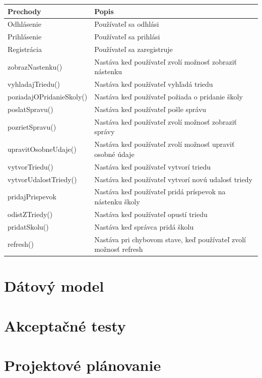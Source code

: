 \documentclass[slovak, 12pt, Times New Roman]{article}
\begin{document}
			\vspace{2cm}

			\begin{tabular} {|p{4.5cm}|p{10.5cm}|}
				\hline
				\textbf{Prechody} & \textbf{Popis} \\
				\hline
				Odhlásenie & Používateľ sa odhlási\\
				\hline
				Prihlásenie & Používateľ sa prihlási\\
				\hline
				Registrácia & Používateľ sa zaregistruje\\
				\hline
				zobrazNastenku() & Nastáva keď používateľ zvolí možnosť zobraziť nástenku\\
				\hline
				vyhladajTriedu() & Nastáva keď používateľ vyhľadá triedu\\
				\hline
				poziadajOPridanieSkoly() & Nastáva keď používateľ požiada o pridanie školy\\
				\hline
				poslatSpravu() & Nastáva keď používateľ pošle správu\\
				\hline
				pozrietSpravu() & Nastáva keď používateľ zvolí možnosť zobraziť správy\\
				\hline
				upravitOsobneUdaje() & Nastáva keď používateľ zvolí možnosť upraviť osobné údaje\\
				\hline
				vytvorTriedu() & Nastáva keď používateľ vytvorí triedu\\
				\hline
				vytvorUdalostTriedy() & Nastáva keď používateľ vytvorí novú udalosť triedy\\
				\hline
				pridajPrispevok & Nastáva keď používateľ pridá príspevok na nástenku školy\\
				\hline
				odistZTriedy() & Nastáva 	keď používateľ opustí triedu\\
				\hline
				pridatSkolu() & Nastáva keď správca pridá školu\\
				\hline
				refresh() & Nastáva pri chybovom stave, keď používateľ zvolí možnosť refresh\\
				\hline
			\end{tabular}
	\section{Dátový model}
	\section{Akceptačné testy}
	\section{Projektové plánovanie}
\end{document}
